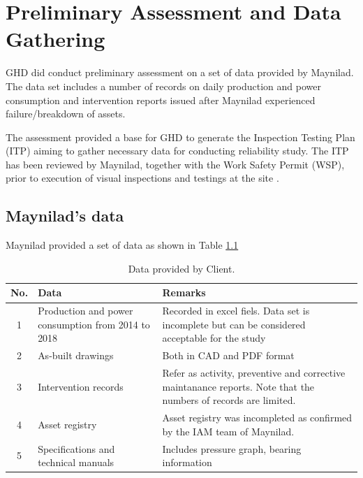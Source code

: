 \chapter{Preliminary Assessment and Data Gathering} %
\label{Chapter2}
GHD did conduct preliminary assessment on a set of data provided by Maynilad. The data set includes a number of records on daily production and power consumption and intervention reports issued after Maynilad experienced failure/breakdown of assets.

The assessment provided a base for GHD to generate the Inspection Testing Plan (ITP) \cite{GHD2018i} aiming to gather necessary data for conducting reliability study. The ITP has been reviewed by Maynilad, together with the Work Safety Permit (WSP), prior to execution of visual inspections and testings at the site \cite{GHD2018e}.

\section{Maynilad's data}
\label{21}
Maynilad provided a set of data as shown in Table \ref{mayniladdata}

\begin{table}[h]
	\caption{Data provided by Client.}
	\label{mayniladdata}
	{\footnotesize
\begin{tabular}{l|p{5cm}|p{8cm}}
	\hline
	\multicolumn{1}{c|}{No.} & Data & Remarks \\ 
	\hline
	\multicolumn{1}{c|}{1} & Production and power consumption from 2014 to 2018 & Recorded in excel fiels. Data set is incomplete but can be considered acceptable for the study \\ 
	\multicolumn{1}{c|}{2} & As-built drawings & Both in CAD and PDF format \\ 
	\multicolumn{1}{c|}{3} & Intervention records & Refer as activity, preventive and corrective maintanance reports. Note that the numbers of records are limited. \\ 
	\multicolumn{1}{c|}{4} & Asset registry & Asset registry was incompleted as confirmed by the IAM team of Maynilad. \\ 
	\multicolumn{1}{c|}{5} & Specifications and technical manuals & Includes pressure graph, bearing information \\ 
	\hline
\end{tabular}
	}
\end{table}


